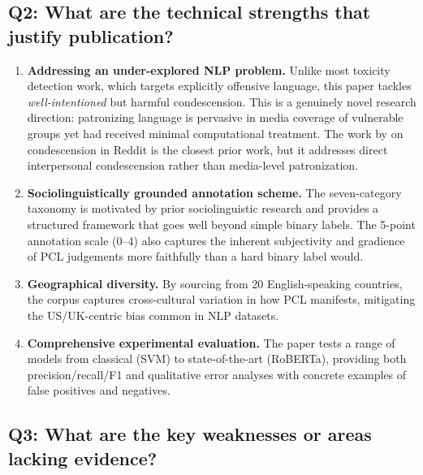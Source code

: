 \documentclass[11pt,a4paper]{article}
\begin{document}
\subsection{Q2: What are the technical strengths that justify publication?}

\begin{enumerate}[leftmargin=*]
    \item \textbf{Addressing an under-explored NLP problem.}
    Unlike most toxicity detection work, which targets explicitly offensive
    language, this paper tackles \emph{well-intentioned} but harmful
    condescension. This is a genuinely novel research direction:
    patronizing language is pervasive in media coverage of vulnerable
    groups yet had received minimal computational treatment. The work by
    \citet{wang2019talkdown} on condescension in Reddit is the closest
    prior work, but it addresses direct interpersonal condescension
    rather than media-level patronization.

    \item \textbf{Sociolinguistically grounded annotation scheme.}
    The seven-category taxonomy is motivated by prior sociolinguistic
    research \citep{margic2017communication, huckin2002textual} and
    provides a structured framework that goes well beyond simple binary
    labels. The 5-point annotation scale (0--4) also captures the
    inherent subjectivity and gradience of PCL judgements more faithfully
    than a hard binary label would.

    \item \textbf{Geographical diversity.}
    By sourcing from 20 English-speaking countries, the corpus captures
    cross-cultural variation in how PCL manifests, mitigating the
    US/UK-centric bias common in NLP datasets.

    \item \textbf{Comprehensive experimental evaluation.}
    The paper tests a range of models from classical (SVM) to
    state-of-the-art (RoBERTa), providing both precision/recall/F1 and
    qualitative error analyses with concrete examples of false positives
    and negatives.
\end{enumerate}

\subsection{Q3: What are the key weaknesses or areas lacking evidence?}
\end{document}
